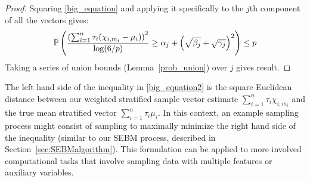 \begin{theorem}

\end{theorem}
\begin{proof}
Squaring \eqref{big_equation} and applying it specifically to the $j$th component of all the vectors gives:
\begin{equation*}
\operatorname{\mathbb{P}}\left(\frac{\left(\sum_{i=1}^n\tau_i(\chi_{i,m_i}-\mu_i)\right)^2}{\log(6/p)} 
\ge \alpha_{j} 
+ \left(\sqrt{\beta_{j}} 
+ \sqrt{\gamma_{j}}\right)^2  \right)
\le p 
\end{equation*}
Taking a series of union bounds (Lemma~\ref{prob_union}) over $j$ gives result.
\end{proof}

The left hand side of the inequality in \eqref{big_equation2} is the square Euclidean distance between our weighted stratified sample vector estimate $\sum_{i=1}^n\tau_i\chi_{i,m_i}$ and the true mean stratified vector $\sum_{i=1}^n\tau_i\mu_{i}$.
In this context, an example sampling process might consist of sampling to maximally minimize the right hand side of the inequality (similar to our SEBM process, described in Section~\ref{sec:SEBMalgorithm}).
This formulation can be applied to more involved computational tasks that involve sampling data with multiple features or auxiliary variables.








